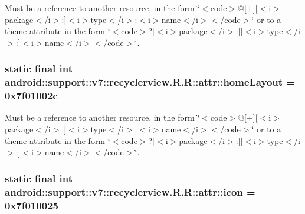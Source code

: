 Must be a reference to another resource, in the form \char`\"{}$<$code$>$@\mbox{[}+\mbox{]}\mbox{[}$<$i$>$package$<$/i$>$:\mbox{]}$<$i$>$type$<$/i$>$:$<$i$>$name$<$/i$>$$<$/code$>$\char`\"{} or to a theme attribute in the form \char`\"{}$<$code$>$?\mbox{[}$<$i$>$package$<$/i$>$:\mbox{]}\mbox{[}$<$i$>$type$<$/i$>$:\mbox{]}$<$i$>$name$<$/i$>$$<$/code$>$\char`\"{}. \hypertarget{classandroid_1_1support_1_1v7_1_1recyclerview_1_1_r_1_1attr_54b21ca2f53c34836753d5276dbc5dff}{
\subsubsection[{homeLayout}]{\setlength{\rightskip}{0pt plus 5cm}static final int android::support::v7::recyclerview.R.R::attr::homeLayout = 0x7f01002c}}
\label{classandroid_1_1support_1_1v7_1_1recyclerview_1_1_r_1_1attr_54b21ca2f53c34836753d5276dbc5dff}


Must be a reference to another resource, in the form \char`\"{}$<$code$>$@\mbox{[}+\mbox{]}\mbox{[}$<$i$>$package$<$/i$>$:\mbox{]}$<$i$>$type$<$/i$>$:$<$i$>$name$<$/i$>$$<$/code$>$\char`\"{} or to a theme attribute in the form \char`\"{}$<$code$>$?\mbox{[}$<$i$>$package$<$/i$>$:\mbox{]}\mbox{[}$<$i$>$type$<$/i$>$:\mbox{]}$<$i$>$name$<$/i$>$$<$/code$>$\char`\"{}. \hypertarget{classandroid_1_1support_1_1v7_1_1recyclerview_1_1_r_1_1attr_837775e9bcb8d997ad384926175dbaa7}{
\subsubsection[{icon}]{\setlength{\rightskip}{0pt plus 5cm}static final int android::support::v7::recyclerview.R.R::attr::icon = 0x7f010025}}
\label{classandroid_1_1support_1_1v7_1_1recyclerview_1_1_r_1_1attr_837775e9bcb8d997ad384926175dbaa7}


